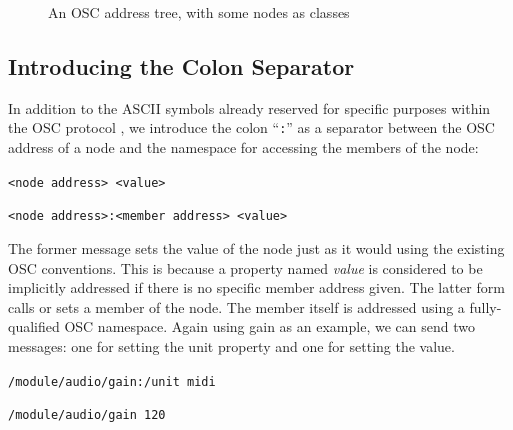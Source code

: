 \documentclass{NIME-alternate}
\begin{document}
\begin{figure}
\centerline{}
\caption{An OSC address tree, with some nodes as classes}
\label{fig:paths}
\end{figure}



\subsection{Introducing the Colon Separator} %
\label{sub:the_colon_separator}

In addition to the ASCII symbols already reserved for specific purposes within the OSC protocol \cite{Wright:1997}, we introduce the colon ``\texttt{:}'' as a separator between the OSC address of a node and the namespace for accessing the members of the node:

\texttt{<node address> <value>}

\texttt{<node address>:<member address> <value>}

The former message sets the value of the node just as it would using the existing OSC conventions. This is because a property named \emph{value} is considered to be implicitly addressed if there is no specific member address given. The latter form calls or sets a member of the node.  The member itself is addressed using a fully-qualified OSC namespace. Again using gain as an example, we can send two messages: one for setting the unit property and one for setting the value.

\texttt{/module/audio/gain:/unit midi}

\texttt{/module/audio/gain 120}

\end{document}
